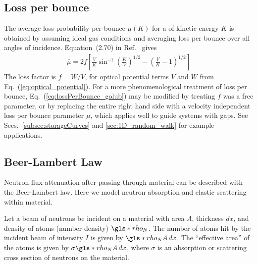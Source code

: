 
\subsection{Loss per bounce}\label{sec:loss_per_bounce}


The average loss probability per bounce $\bar{\mu}(K)$ for a \ucn of kinetic energy $K$ is obtained by assuming ideal gas conditions and averaging loss per bounce over all angles of incidence. Equation~(2.70) in Ref.~\cite{golubUCN} gives
%
\begin{gather}
    \bar{\mu} = 2f \left[ \frac{V}{K} \sin^{-1}\left( \frac{K}{V}\right)^{1/2} -\left( \frac{V}{K} - 1 \right)^{1/2} \right] \label{eq:lossPerBounce_golub}
\end{gather}
%
The loss factor is $f=W/V$, for optical potential terms $V$ and $W$ from Eq.~(\ref{eq:optical_potential}). For a more phenomenological treatment of loss per bounce, Eq.~(\ref{eq:lossPerBounce_golub}) may be modified by treating $f$ was a free parameter, or by replacing the entire right hand side with a velocity independent loss per bounce parameter $\mu$, which applies well to guide systems with gaps. See Secs.~\ref{subsec:storageCurves} and \ref{sec:1D_random_walk} for example applications.


\subsection{Beer-Lambert Law}\label{sec:beer_lambert_law}


Neutron flux attenuation after passing through material can be described with the Beer-Lambert law. Here we model neutron absorption and elastic scattering within material.

Let a beam of neutrons be incident on a material with area $A$, thickness $dx$, and density of atoms (number density) $\gls*{rho_N}$. The number of atoms hit by the incident beam of intensity $I$ is given by $\gls*{rho_N} A\,dx$. The ``effective area'' of the atoms is given by $\sigma \gls*{rho_N} A \, dx$, where $\sigma$ is an absorption or scattering cross section of neutrons on the material.

